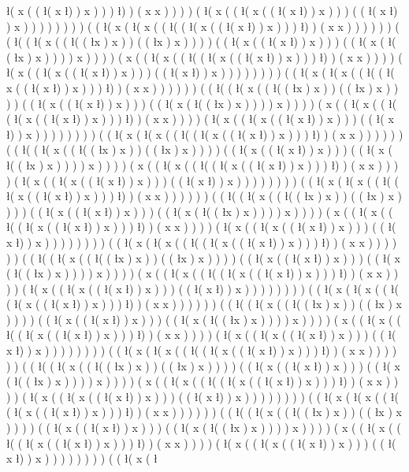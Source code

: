 \l ( x ( ( \l ( x \l ) ) x ) ) ) \l ) ) ( x x ) ) ) ) ( \l ( x ( ( \l ( x ( ( \l ( x \l ) ) x ) ) ) ( ( \l ( x \l ) ) x ) ) ) ) ) ) ) ) ( ( \l ( x ( \l ( x ( ( \l ( ( \l ( x ( ( \l ( x \l ) ) x ) ) ) \l ) ) ( x x ) ) ) ) ) ) ( ( \l ( ( \l ( x ( ( \l ( ( \l x ) x ) ) ( ( \l x ) x ) ) ) ) ( ( \l ( x ( ( \l ( x \l ) ) x ) ) ) ( ( \l ( x ( \l ( ( \l x ) x ) ) ) ) x ) ) ) ) ( x ( ( \l ( x ( ( \l ( ( \l ( x ( ( \l ( x \l ) ) x ) ) ) \l ) ) ( x x ) ) ) ) ( \l ( x ( ( \l ( x ( ( \l ( x \l ) ) x ) ) ) ( ( \l ( x \l ) ) x ) ) ) ) ) ) ) ) ( ( \l ( x ( \l ( x ( ( \l ( ( \l ( x ( ( \l ( x \l ) ) x ) ) ) \l ) ) ( x x ) ) ) ) ) ) ( ( \l ( ( \l ( x ( ( \l ( ( \l x ) x ) ) ( ( \l x ) x ) ) ) ) ( ( \l ( x ( ( \l ( x \l ) ) x ) ) ) ( ( \l ( x ( \l ( ( \l x ) x ) ) ) ) x ) ) ) ) ( x ( ( \l ( x ( ( \l ( ( \l ( x ( ( \l ( x \l ) ) x ) ) ) \l ) ) ( x x ) ) ) ) ( \l ( x ( ( \l ( x ( ( \l ( x \l ) ) x ) ) ) ( ( \l ( x \l ) ) x ) ) ) ) ) ) ) ) ( ( \l ( x ( \l ( x ( ( \l ( ( \l ( x ( ( \l ( x \l ) ) x ) ) ) \l ) ) ( x x ) ) ) ) ) ) ( ( \l ( ( \l ( x ( ( \l ( ( \l x ) x ) ) ( ( \l x ) x ) ) ) ) ( ( \l ( x ( ( \l ( x \l ) ) x ) ) ) ( ( \l ( x ( \l ( ( \l x ) x ) ) ) ) x ) ) ) ) ( x ( ( \l ( x ( ( \l ( ( \l ( x ( ( \l ( x \l ) ) x ) ) ) \l ) ) ( x x ) ) ) ) ( \l ( x ( ( \l ( x ( ( \l ( x \l ) ) x ) ) ) ( ( \l ( x \l ) ) x ) ) ) ) ) ) ) ) ( ( \l ( x ( \l ( x ( ( \l ( ( \l ( x ( ( \l ( x \l ) ) x ) ) ) \l ) ) ( x x ) ) ) ) ) ) ( ( \l ( ( \l ( x ( ( \l ( ( \l x ) x ) ) ( ( \l x ) x ) ) ) ) ( ( \l ( x ( ( \l ( x \l ) ) x ) ) ) ( ( \l ( x ( \l ( ( \l x ) x ) ) ) ) x ) ) ) ) ( x ( ( \l ( x ( ( \l ( ( \l ( x ( ( \l ( x \l ) ) x ) ) ) \l ) ) ( x x ) ) ) ) ( \l ( x ( ( \l ( x ( ( \l ( x \l ) ) x ) ) ) ( ( \l ( x \l ) ) x ) ) ) ) ) ) ) ) ( ( \l ( x ( \l ( x ( ( \l ( ( \l ( x ( ( \l ( x \l ) ) x ) ) ) \l ) ) ( x x ) ) ) ) ) ) ( ( \l ( ( \l ( x ( ( \l ( ( \l x ) x ) ) ( ( \l x ) x ) ) ) ) ( ( \l ( x ( ( \l ( x \l ) ) x ) ) ) ( ( \l ( x ( \l ( ( \l x ) x ) ) ) ) x ) ) ) ) ( x ( ( \l ( x ( ( \l ( ( \l ( x ( ( \l ( x \l ) ) x ) ) ) \l ) ) ( x x ) ) ) ) ( \l ( x ( ( \l ( x ( ( \l ( x \l ) ) x ) ) ) ( ( \l ( x \l ) ) x ) ) ) ) ) ) ) ) ( ( \l ( x ( \l ( x ( ( \l ( ( \l ( x ( ( \l ( x \l ) ) x ) ) ) \l ) ) ( x x ) ) ) ) ) ) ( ( \l ( ( \l ( x ( ( \l ( ( \l x ) x ) ) ( ( \l x ) x ) ) ) ) ( ( \l ( x ( ( \l ( x \l ) ) x ) ) ) ( ( \l ( x ( \l ( ( \l x ) x ) ) ) ) x ) ) ) ) ( x ( ( \l ( x ( ( \l ( ( \l ( x ( ( \l ( x \l ) ) x ) ) ) \l ) ) ( x x ) ) ) ) ( \l ( x ( ( \l ( x ( ( \l ( x \l ) ) x ) ) ) ( ( \l ( x \l ) ) x ) ) ) ) ) ) ) ) ( ( \l ( x ( \l ( x ( ( \l ( ( \l ( x ( ( \l ( x \l ) ) x ) ) ) \l ) ) ( x x ) ) ) ) ) ) ( ( \l ( ( \l ( x ( ( \l ( ( \l x ) x ) ) ( ( \l x ) x ) ) ) ) ( ( \l ( x ( ( \l ( x \l ) ) x ) ) ) ( ( \l ( x ( \l ( ( \l x ) x ) ) ) ) x ) ) ) ) ( x ( ( \l ( x ( ( \l ( ( \l ( x ( ( \l ( x \l ) ) x ) ) ) \l ) ) ( x x ) ) ) ) ( \l ( x ( ( \l ( x ( ( \l ( x \l ) ) x ) ) ) ( ( \l ( x \l ) ) x ) ) ) ) ) ) ) ) ( ( \l ( x ( \l ( x ( ( \l ( ( \l ( x ( ( \l ( x \l ) ) x ) ) ) \l ) ) ( x x ) ) ) ) ) ) ( ( \l ( ( \l ( x ( ( \l ( ( \l x ) x ) ) ( ( \l x ) x ) ) ) ) ( ( \l ( x ( ( \l ( x \l ) ) x ) ) ) ( ( \l ( x ( \l ( ( \l x ) x ) ) ) ) x ) ) ) ) ( x ( ( \l ( x ( ( \l ( ( \l ( x ( ( \l ( x \l ) ) x ) ) ) \l ) ) ( x x ) ) ) ) ( \l ( x ( ( \l ( x ( ( \l ( x \l ) ) x ) ) ) ( ( \l ( x \l ) ) x ) ) ) ) ) ) ) ) ( ( \l ( x ( \l 